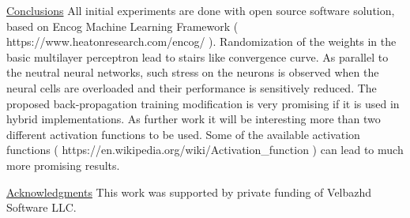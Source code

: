 \documentclass{article}
\begin{document}
\underline{Conclusions} All initial experiments are done with open source software solution, based on Encog Machine Learning Framework ( https://www.heatonresearch.com/encog/ ). Randomization of the weights in the basic multilayer perceptron lead to stairs like convergence curve. As parallel to the neutral neural networks, such stress on the neurons is observed when the neural cells are overloaded and their performance is sensitively reduced. The proposed back-propagation training modification is very promising if it is used in hybrid implementations. As further work it will be interesting more than two different activation functions to be used. Some of the available activation functions ( https://en.wikipedia.org/wiki/Activation\_function ) can lead to much more promising results.
\vspace*{5mm}

\underline{Acknowledgments} This work was supported by private funding of Velbazhd Software LLC.
\end{document}
